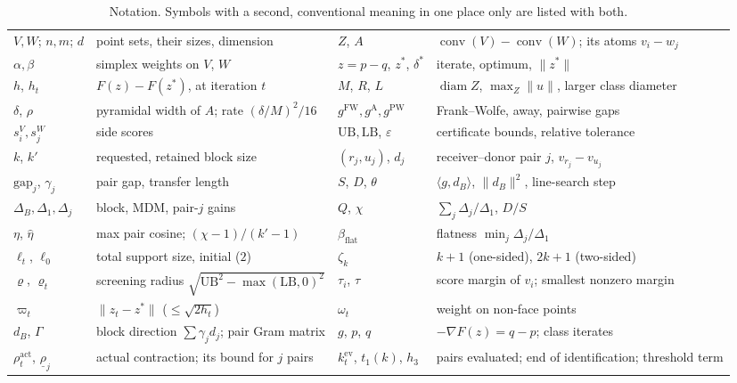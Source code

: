 \documentclass[pdflatex,sn-apa]{sn-jnl}%
\theoremstyle{thmstyleone}
\theoremstyle{thmstyletwo}
\newcommand{\conv}{\operatorname{conv}}
\newcommand{\ip}[2]{\langle #1, #2 \rangle}
\newcommand{\norm}[1]{\lVert #1 \rVert}
\newcommand{\gFW}{g^{\mathrm{FW}}}
\newcommand{\gA}{g^{\mathrm{A}}}
\newcommand{\gPW}{g^{\mathrm{PW}}}
\newcommand{\UB}{\mathrm{UB}}
\newcommand{\LB}{\mathrm{LB}}
\begin{document}
\begin{table}[t]\centering\scriptsize\setlength{\tabcolsep}{3pt}
\caption{Notation. Symbols with a second, conventional meaning in one
place only are listed with both.}\label{tab:notation}
\begin{tabular}{@{}l>{\raggedright\arraybackslash}p{3.6cm}l>{\raggedright\arraybackslash}p{4.0cm}@{}}\toprule
$V,W$; $n,m$; $d$ & point sets, their sizes, dimension & $Z$, $A$ & $\conv(V)-\conv(W)$; its atoms $v_i-w_j$ \\
$\alpha,\beta$ & simplex weights on $V$, $W$ & $z=p-q$, $z^*$, $\delta^*$ & iterate, optimum, $\norm{z^*}$ \\
$h$, $h_t$ & $F(z)-F(z^*)$, at iteration $t$ & $M$, $R$, $L$ & $\operatorname{diam}Z$, $\max_Z\norm u$, larger class diameter \\
$\delta$, $\rho$ & pyramidal width of $A$; rate $(\delta/M)^2/16$ & $\gFW,\gA,\gPW$ & Frank--Wolfe, away, pairwise gaps \\
$s^V_i,s^W_j$ & side scores & $\UB,\LB$, $\varepsilon$ & certificate bounds, relative tolerance \\
$k$, $k'$ & requested, retained block size & $(r_j,u_j)$, $d_j$ & receiver--donor pair $j$, $v_{r_j}-v_{u_j}$ \\
$\mathrm{gap}_j$, $\gamma_j$ & pair gap, transfer length & $S$, $D$, $\theta$ & $\ip{g}{d_B}$, $\norm{d_B}^2$, line-search step \\
$\Delta_B,\Delta_1,\Delta_j$ & block, MDM, pair-$j$ gains & $Q$, $\chi$ & $\sum_j\Delta_j/\Delta_1$, $D/S$ \\
$\eta$, $\hat\eta$ & max pair cosine; $(\chi-1)/(k'-1)$ & $\beta_{\mathrm{flat}}$ & flatness $\min_j\Delta_j/\Delta_1$ \\
$\ell_t$, $\ell_0$ & total support size, initial ($2$) & $\zeta_k$ & $k+1$ (one-sided), $2k+1$ (two-sided) \\
$\varrho$, $\varrho_t$ & screening radius $\sqrt{\UB^2-\max(\LB,0)^2}$ & $\tau_i$, $\tau$ & score margin of $v_i$; smallest nonzero margin \\
$\varpi_t$ & $\norm{z_t-z^*}$ ($\le\sqrt{2h_t}$) & $\omega_t$ & weight on non-face points \\
$d_B$, $\Gamma$ & block direction $\sum\gamma_jd_j$; pair Gram matrix & $g$, $p$, $q$ & $-\nabla F(z)=q-p$; class iterates \\
$\rho^{\mathrm{act}}_t$, $\underline\rho_j$ & actual contraction; its bound for $j$ pairs & $k^{\mathrm{ev}}_t$, $t_1(k)$, $h_3$ & pairs evaluated; end of identification; threshold term \\

\end{tabular}
\end{table}
\end{document}
